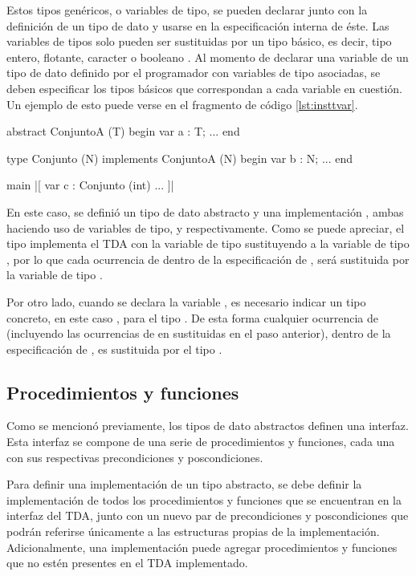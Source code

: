 {{Estos tipos genéricos, o variables de tipo, se pueden declarar junto con la
definición de un tipo de dato y usarse en la especificación interna de éste. Las
variables de tipos solo pueden ser sustituidas por un tipo básico, es decir,
tipo entero, flotante, caracter o booleano . Al momento de
declarar una variable de un tipo de dato definido por el programador con
variables de tipo asociadas, se deben  especificar los tipos básicos que
correspondan a cada variable en cuestión. Un ejemplo de esto puede verse en el
fragmento de código \ref{lst:insttvar}.

\begin{gracielacode}[caption=Instanciación de variables de tipo, label=lst:insttvar]
abstract ConjuntoA (T) begin
  var a : T;
  ...
end

type Conjunto (N) implements ConjuntoA (N) begin
  var b : N;
  ...
end

main
 |[ var c : Conjunto (int)
    ...
 ]|
\end{gracielacode}

En este caso, se definió un tipo de dato abstracto  y una
implementación , ambas haciendo uso de variables de tipo,
 y  respectivamente. Como se puede apreciar, el tipo
 implementa el TDA  con la variable de tipo
 sustituyendo a la variable de tipo , por lo que cada
ocurrencia de  dentro de la especificación de , será
sustituida por la variable de tipo .

Por otro lado, cuando se declara la variable , es necesario indicar un
tipo concreto, en este caso , para el tipo . De
esta forma cualquier ocurrencia de  (incluyendo las ocurrencias de
 en  sustituidas en el paso anterior), dentro de la
especificación de , es sustituida por el tipo .

\subsection{Procedimientos y funciones}

Como se mencionó previamente, los tipos de dato abstractos definen una
interfaz. Esta interfaz se compone de una serie de procedimientos y funciones,
cada una con sus respectivas precondiciones y poscondiciones.

Para definir una implementación de un tipo abstracto, se debe definir la
implementación de todos los procedimientos y funciones que se encuentran en la
interfaz del TDA, junto con un nuevo par de precondiciones y poscondiciones que
podrán referirse únicamente a las estructuras propias de la implementación.
Adicionalmente, una implementación puede agregar procedimientos y funciones que
no estén presentes en el TDA implementado.

}}

